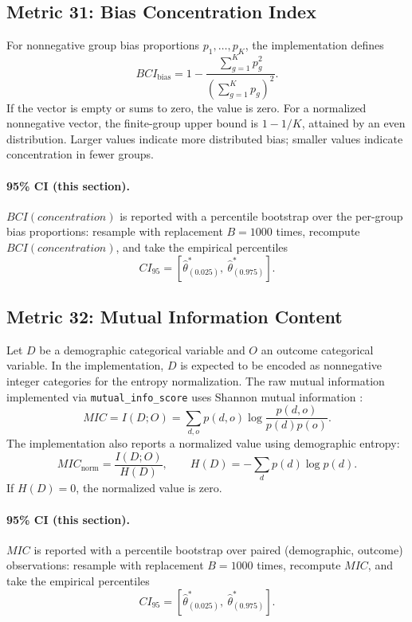 \documentclass[11pt]{article}
\begin{document}
\subsection{Metric 31: Bias Concentration Index}

For nonnegative group bias proportions $p_1,\ldots,p_K$, the implementation
defines
\begin{equation}
BCI_{\mathrm{bias}}=
1-\frac{\sum_{g=1}^{K}p_g^2}{\left(\sum_{g=1}^{K}p_g\right)^2}.
\end{equation}
If the vector is empty or sums to zero, the value is zero. For a normalized
nonnegative vector, the finite-group upper bound is $1-1/K$, attained by an even
distribution. Larger values indicate more distributed bias; smaller values
indicate concentration in fewer groups.


\paragraph{95\% CI (this section).} $BCI(concentration)$ is reported with a percentile bootstrap over the per-group bias proportions: resample with replacement $B=1000$ times, recompute $BCI(concentration)$, and take the empirical percentiles
\begin{equation}
CI_{95}=\left[\hat\theta^{\ast}_{(0.025)},\ \hat\theta^{\ast}_{(0.975)}\right].
\end{equation}

\subsection{Metric 32: Mutual Information Content}

Let $D$ be a demographic categorical variable and $O$ an outcome categorical
variable. In the implementation, $D$ is expected to be encoded as nonnegative
integer categories for the entropy normalization. The raw mutual information
implemented via \texttt{mutual\_info\_score}
uses Shannon mutual information \cite{shannon1948}:
\begin{equation}
MIC=I(D;O)=\sum_{d,o}p(d,o)\log\frac{p(d,o)}{p(d)p(o)}.
\end{equation}
The implementation also reports a normalized value using demographic entropy:
\begin{equation}
MIC_{\mathrm{norm}}=\frac{I(D;O)}{H(D)},\qquad
H(D)=-\sum_d p(d)\log p(d).
\end{equation}
If $H(D)=0$, the normalized value is zero.


\paragraph{95\% CI (this section).} $MIC$ is reported with a percentile bootstrap over paired (demographic, outcome) observations: resample with replacement $B=1000$ times, recompute $MIC$, and take the empirical percentiles
\begin{equation}
CI_{95}=\left[\hat\theta^{\ast}_{(0.025)},\ \hat\theta^{\ast}_{(0.975)}\right].
\end{equation}
\end{document}
